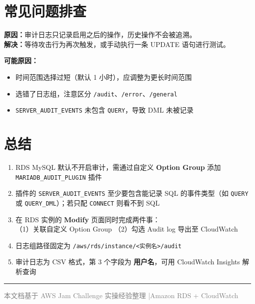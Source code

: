 \documentclass[12pt, a4paper]{article}
\begin{document}
\section{常见问题排查}

\begin{tcolorbox}[colback=warnbg, colframe=warnframe, title={\textbf{问题1：CloudWatch 日志组中只有 SELECT，没有 UPDATE 记录}}]
\textbf{原因：}审计日志只记录启用之后的操作，历史操作不会被追溯。\\
\textbf{解决：}等待攻击行为再次触发，或手动执行一条 UPDATE 语句进行测试。
\end{tcolorbox}

\vspace{0.5em}

\begin{tcolorbox}[colback=warnbg, colframe=warnframe, title={\textbf{问题2：CloudWatch Insights 查询返回 0 条结果}}]
\textbf{可能原因：}
\begin{itemize}
  \item 时间范围选择过短（默认 1 小时），应调整为更长时间范围
  \item 选错了日志组，注意区分 \texttt{/audit}、\texttt{/error}、\texttt{/general}
  \item \texttt{SERVER\_AUDIT\_EVENTS} 未包含 \texttt{QUERY}，导致 DML 未被记录
\end{itemize}
\end{tcolorbox}

\section{总结}

\begin{tcolorbox}[colback=noteblue, colframe=noteframe, title={\textbf{Task 1 核心要点}}]
\begin{enumerate}
  \item RDS MySQL 默认不开启审计，需通过自定义 \textbf{Option Group} 添加 \texttt{MARIADB\_AUDIT\_PLUGIN} 插件
  \item 插件的 \texttt{SERVER\_AUDIT\_EVENTS} 至少要包含能记录 SQL 的事件类型（如 \texttt{QUERY} 或 \texttt{QUERY\_DML}）；若只配 \texttt{CONNECT} 则看不到 SQL
  \item 在 RDS 实例的 \textbf{Modify} 页面同时完成两件事：\\
  （1）关联自定义 Option Group \quad（2）勾选 Audit log 导出至 CloudWatch
  \item 日志组路径固定为 \texttt{/aws/rds/instance/<实例名>/audit}
  \item 审计日志为 CSV 格式，第 3 个字段为 \textbf{用户名}，可用 CloudWatch Insights 解析查询
\end{enumerate}
\end{tcolorbox}

\vspace{2em}
\noindent\rule{\textwidth}{0.4pt}
\begin{center}
\textcolor{gray}{\small 本文档基于 AWS Jam Challenge 实操经验整理 \quad|\quad Amazon RDS + CloudWatch}
\end{center}
\end{document}
